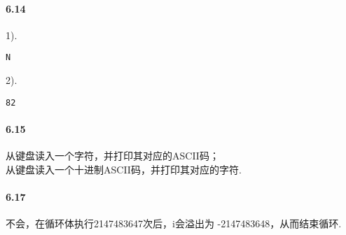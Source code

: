 \documentclass[UTF8]{ctexart}
\begin{document}
\paragraph{6.14\\}
1).
\begin{lstlisting}[showspaces=true, showlines=true]
N

\end{lstlisting}
2).
\begin{lstlisting}[showspaces=true, showlines=true]
82

\end{lstlisting}

\linespread{1.5}

\paragraph{6.15\\}
从键盘读入一个字符，并打印其对应的ASCII码；\\
从键盘读入一个十进制ASCII码，并打印其对应的字符.

\paragraph{6.17\\}
不会，在循环体执行2147483647次后，i会溢出为 -2147483648，从而结束循环.
\end{document}
